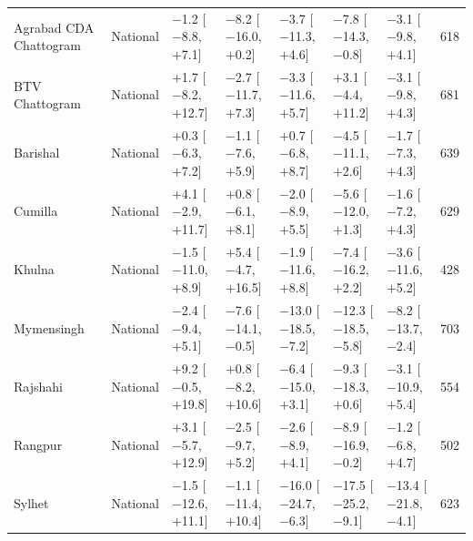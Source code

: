 \begin{longtable}{L{2.8cm} L{1.4cm} C{2.0cm} C{2.0cm} C{2.0cm} C{2.0cm} C{2.0cm} C{0.9cm}}
Agrabad CDA Chattogram & National & $-$1.2 {\scriptsize[$-$8.8, $+$7.1]} & $-$8.2 {\scriptsize[$-$16.0, $+$0.2]} & $-$3.7 {\scriptsize[$-$11.3, $+$4.6]} & $-$7.8 {\scriptsize[$-$14.3, $-$0.8]} & $-$3.1 {\scriptsize[$-$9.8, $+$4.1]} & 618 \\
BTV Chattogram & National & $+$1.7 {\scriptsize[$-$8.2, $+$12.7]} & $-$2.7 {\scriptsize[$-$11.7, $+$7.3]} & $-$3.3 {\scriptsize[$-$11.6, $+$5.7]} & $+$3.1 {\scriptsize[$-$4.4, $+$11.2]} & $-$3.1 {\scriptsize[$-$9.8, $+$4.3]} & 681 \\
Barishal & National & $+$0.3 {\scriptsize[$-$6.3, $+$7.2]} & $-$1.1 {\scriptsize[$-$7.6, $+$5.9]} & $+$0.7 {\scriptsize[$-$6.8, $+$8.7]} & $-$4.5 {\scriptsize[$-$11.1, $+$2.6]} & $-$1.7 {\scriptsize[$-$7.3, $+$4.3]} & 639 \\
Cumilla & National & $+$4.1 {\scriptsize[$-$2.9, $+$11.7]} & $+$0.8 {\scriptsize[$-$6.1, $+$8.1]} & $-$2.0 {\scriptsize[$-$8.9, $+$5.5]} & $-$5.6 {\scriptsize[$-$12.0, $+$1.3]} & $-$1.6 {\scriptsize[$-$7.2, $+$4.3]} & 629 \\
Khulna & National & $-$1.5 {\scriptsize[$-$11.0, $+$8.9]} & $+$5.4 {\scriptsize[$-$4.7, $+$16.5]} & $-$1.9 {\scriptsize[$-$11.6, $+$8.8]} & $-$7.4 {\scriptsize[$-$16.2, $+$2.2]} & $-$3.6 {\scriptsize[$-$11.6, $+$5.2]} & 428 \\
Mymensingh & National & $-$2.4 {\scriptsize[$-$9.4, $+$5.1]} & $-$7.6 {\scriptsize[$-$14.1, $-$0.5]} & $-$13.0 {\scriptsize[$-$18.5, $-$7.2]} & $-$12.3 {\scriptsize[$-$18.5, $-$5.8]} & $-$8.2 {\scriptsize[$-$13.7, $-$2.4]} & 703 \\
Rajshahi & National & $+$9.2 {\scriptsize[$-$0.5, $+$19.8]} & $+$0.8 {\scriptsize[$-$8.2, $+$10.6]} & $-$6.4 {\scriptsize[$-$15.0, $+$3.1]} & $-$9.3 {\scriptsize[$-$18.3, $+$0.6]} & $-$3.1 {\scriptsize[$-$10.9, $+$5.4]} & 554 \\
Rangpur & National & $+$3.1 {\scriptsize[$-$5.7, $+$12.9]} & $-$2.5 {\scriptsize[$-$9.7, $+$5.2]} & $-$2.6 {\scriptsize[$-$8.9, $+$4.1]} & $-$8.9 {\scriptsize[$-$16.9, $-$0.2]} & $-$1.2 {\scriptsize[$-$6.8, $+$4.7]} & 502 \\
Sylhet & National & $-$1.5 {\scriptsize[$-$12.6, $+$11.1]} & $-$1.1 {\scriptsize[$-$11.4, $+$10.4]} & $-$16.0 {\scriptsize[$-$24.7, $-$6.3]} & $-$17.5 {\scriptsize[$-$25.2, $-$9.1]} & $-$13.4 {\scriptsize[$-$21.8, $-$4.1]} & 623 \\
\end{longtable}
\endgroup
